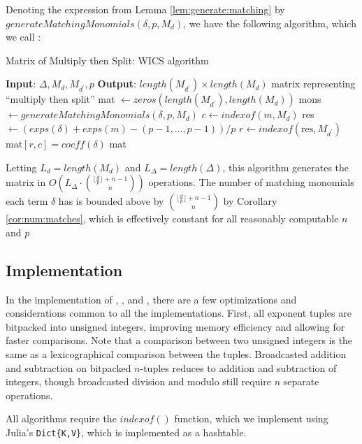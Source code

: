 Denoting the expression from Lemma \ref{lem:generate:matching} 
by $generateMatchingMonomials(\delta, p, M_d)$, we have
the following algorithm, which we call \wics:

\begin{algorithm}[H]
    \caption{Matrix of Multiply then Split: WICS algorithm}
    \label{alg:matrix:WICS}
    \begin{algorithmic}[1]
    \State \textbf{Input}: $\Delta, M_{d}, M_{d^{\prime}}, p$
    \State \textbf{Output}: $length(M_{d^{\prime}}) \times length(M_{d})$ matrix representing ``multiply then split''
    \State mat $\gets zeros(length(M_{d^{\prime}}), length(M_{d}))$
    \For{$\delta \in \Delta$}
        \State mons $\gets generateMatchingMonomials(\delta, p, M_{d})$
		    \State $c \gets indexof(m,M_{d})$
			\State res $\gets (exps(\delta) + exps(m) - (p-1, \ldots, p-1)) / p$
			\State $r \gets indexof(\text{res},M_{d^{\prime}})$
            \State $\text{mat}[r, c] = coeff(\delta)$
        \EndFor
    \EndFor
    \State \Return mat
    \end{algorithmic}
\end{algorithm}

Letting $L_{d} = length(M_d)$ and 
$L_{\Delta} = length(\Delta)$, this algorithm 
generates the matrix in 
$O \left( L_{\Delta} \cdot \binom{\lfloor \frac{d}{p} \rfloor + n - 1}{n} \right)$ operations.
The number of matching monomials each term $\delta$ 
has is bounded above by $\binom{\lfloor \frac{d}{p} \rfloor + n - 1}{n}$ 
by Corollary \ref{cor:num:matches}, which is 
effectively constant for all reasonably computable $n$ and $p$

\subsection{Implementation}

In the implementation of \triv, \merge, and \wics, there are a 
few optimizations and considerations common to all the implementations.
First, all exponent tuples are bitpacked into 
unsigned integers, improving memory efficiency 
and allowing for faster comparisons.
Note that a comparison between two unsigned integers 
is the same as a lexicographical comparison between the tuples.
Broadcasted addition and subtraction on bitpacked 
$n$-tuples reduces to addition and subtraction of 
integers, though broadcasted division and modulo still 
require $n$ separate operations.

All algorithms require the $indexof()$ function, 
which we implement using Julia's \texttt{Dict\{K,V\}}, 
which is implemented as a hashtable.

